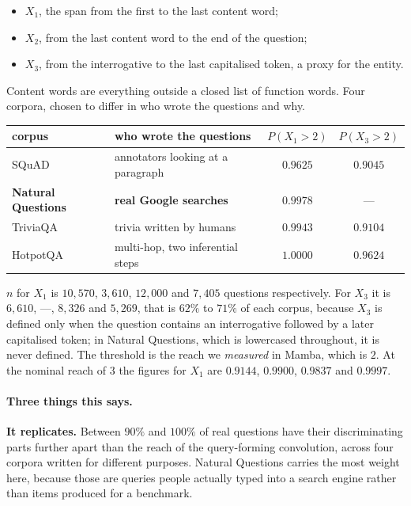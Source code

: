 \documentclass[11pt,a4paper]{article}
\begin{document}
\begin{itemize}
\item $X_1$, the span from the first to the last content word;
\item $X_2$, from the last content word to the end of the question;
\item $X_3$, from the interrogative to the last capitalised token, a proxy for the entity.
\end{itemize}

Content words are everything outside a closed list of function words. Four corpora, chosen to differ
in who wrote the questions and why.

\begin{center}
\begin{tabular}{llcc}
\toprule
corpus & who wrote the questions & $P(X_1 > 2)$ & $P(X_3 > 2)$ \\
\midrule
SQuAD & annotators looking at a paragraph & $0.9625$ & $0.9045$ \\
\textbf{Natural Questions} & \textbf{real Google searches} & $\mathbf{0.9978}$ & --- \\
TriviaQA & trivia written by humans & $0.9943$ & $0.9104$ \\
HotpotQA & multi-hop, two inferential steps & $\mathbf{1.0000}$ & $0.9624$ \\
\bottomrule
\end{tabular}
\end{center}

$n$ for $X_1$ is $10{,}570$, $3{,}610$, $12{,}000$ and $7{,}405$ questions respectively. For $X_3$ it
is $6{,}610$, ---, $8{,}326$ and $5{,}269$, that is $62\%$ to $71\%$ of each corpus, because $X_3$ is
defined only when the question contains an interrogative followed by a later capitalised token; in
Natural Questions, which is lowercased throughout, it is never defined. The threshold is the reach we
\emph{measured} in Mamba, which is $2$. At the nominal reach of $3$ the figures for $X_1$ are
$0.9144$, $0.9900$, $0.9837$ and $0.9997$.

\paragraph{Three things this says.}

\textbf{It replicates.} Between $90\%$ and $100\%$ of real questions have their discriminating parts
further apart than the reach of the query-forming convolution, across four corpora written for
different purposes. Natural Questions carries the most weight here, because those are queries people
actually typed into a search engine rather than items produced for a benchmark.
\end{document}
